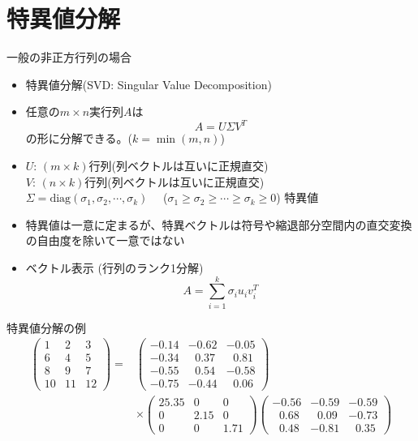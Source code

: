 \section{特異値分解}

\begin{frame}[t,fragile]{一般の非正方行列の場合}
  \begin{itemize}
  \item 特異値分解(SVD: Singular Value Decomposition)
  \item 任意の$m \times n$実行列$A$は
    \[
    A = U \Sigma V^T
    \]
    の形に分解できる。($k=\min(m,n)$)
  \item $U$: $(m \times k)$行列(列ベクトルは互いに正規直交) \\
    $V$: $(n \times k)$行列(列ベクトルは互いに正規直交) \\
    $\Sigma = \text{diag}(\sigma_1,\sigma_2,\cdots,\sigma_k)$ \ \ ($\sigma_1\ge\sigma_2\ge\cdots\ge\sigma_k\ge 0$) 特異値
  \item 特異値は一意に定まるが、特異ベクトルは符号や縮退部分空間内の直交変換の自由度を除いて一意ではない
  \item ベクトル表示 (行列のランク1分解)
    \[
    A = \sum_{i=1}^k \sigma_i u_i v_i^{T}
    \]
  \end{itemize}
\end{frame}

\begin{frame}[t,fragile]{特異値分解の例}
  \[
  \begin{split}
    \begin{pmatrix}
      1 & 2 & 3 \\
      6 & 4 & 5 \\
      8 & 9 & 7 \\
      10 & 11 & 12
    \end{pmatrix} =&
    \begin{pmatrix}
      -0.14 & -0.62 & -0.05 \\
      -0.34 & \ \ \,0.37 & \ \ \,0.81 \\
      -0.55 & \ \ \,0.54 & -0.58 \\
      -0.75 & -0.44 & \ \ \,0.06      
    \end{pmatrix} \\
    &\times
    \begin{pmatrix}
      25.35 & 0 & 0 \\
      0 & 2.15 & 0 \\
      0 & 0 & 1.71
    \end{pmatrix}
    \begin{pmatrix}
      -0.56 & -0.59 & -0.59 \\
      \ \ \,0.68 & \ \ \,0.09 & -0.73 \\
      \ \ \,0.48 & -0.81 & \ \ \,0.35
    \end{pmatrix}
  \end{split}
  \]
\end{frame}

